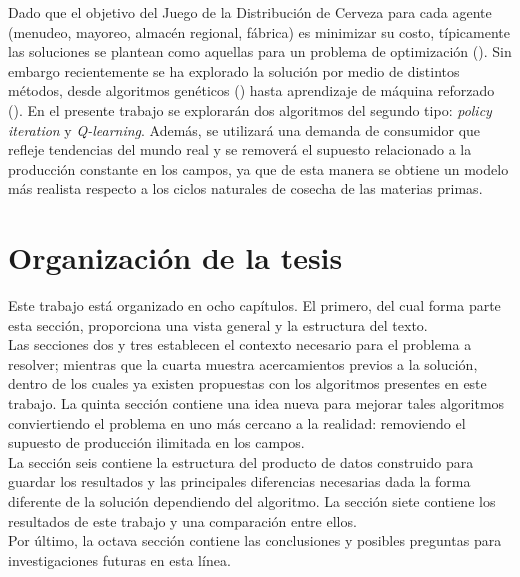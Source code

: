 Dado que el objetivo del Juego de la Distribuci\'on de Cerveza para cada agente (menudeo, mayoreo, almac\'en regional, f\'abrica) es minimizar su costo, t\'ipicamente las soluciones se plantean como aquellas para un problema de optimizaci\'on (\citet{Sterman}). Sin embargo recientemente se ha explorado la soluci\'on por medio de distintos m\'etodos, desde algoritmos gen\'eticos (\citet{Strozzi}) hasta aprendizaje de m\'aquina reforzado (\citet{Chaharsooghi}). En el presente trabajo se explorar\'an dos algoritmos del segundo tipo: \textit{policy iteration} y \textit{Q-learning}. Adem\'as, se utilizar\'a una demanda de consumidor que refleje tendencias del mundo real y se remover\'a el supuesto relacionado a la producci\'on constante en los campos, ya que de esta manera se obtiene un modelo m\'as realista respecto a los ciclos naturales de cosecha de las materias primas.

\section{Organizaci\'on de la tesis}

Este trabajo est\'a organizado en ocho cap\'itulos. El primero, del cual forma parte esta secci\'on, proporciona una vista general y la estructura del texto.\\

Las secciones dos y tres establecen el contexto necesario para el problema a resolver; mientras que la cuarta muestra acercamientos previos a la soluci\'on, dentro de los cuales ya existen propuestas con los algoritmos presentes en este trabajo. La quinta secci\'on contiene una idea nueva para mejorar tales algoritmos conviertiendo el problema en uno m\'as cercano a la realidad: removiendo el supuesto de producci\'on ilimitada en los campos.\\

La secci\'on seis contiene la estructura del producto de datos construido para guardar los resultados y las principales diferencias necesarias dada la forma diferente de la soluci\'on dependiendo del algoritmo. La secci\'on siete contiene los resultados de este trabajo y una comparaci\'on entre ellos.\\

Por \'ultimo, la octava secci\'on contiene las conclusiones y posibles preguntas para investigaciones futuras en esta l\'inea.